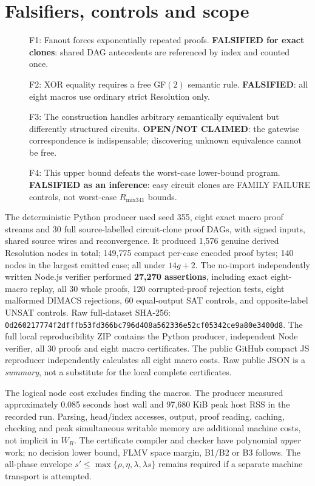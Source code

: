 \documentclass[11pt]{article}
\begin{document}
\section*{Falsifiers, controls and scope}
\begin{description}
\item[] F1: Fanout forces exponentially repeated proofs. \textbf{FALSIFIED for exact clones}: shared DAG antecedents are referenced by index and counted once.
\item[] F2: XOR equality requires a free GF$(2)$ semantic rule. \textbf{FALSIFIED}: all eight macros use ordinary strict Resolution only.
\item[] F3: The construction handles arbitrary semantically equivalent but differently structured circuits. \textbf{OPEN/NOT CLAIMED}: the gatewise correspondence is indispensable; discovering unknown equivalence cannot be free.
\item[] F4: This upper bound defeats the worst-case lower-bound program. \textbf{FALSIFIED as an inference}: easy circuit clones are FAMILY FAILURE controls, not worst-case $R_{\mathrm{mix341}}$ bounds.
\end{description}
The deterministic Python producer used seed 355, eight exact macro proof streams and 30 full source-labelled circuit-clone proof DAGs, with signed inputs, shared source wires and reconvergence. It produced 1,576 genuine derived Resolution nodes in total; 149,775 compact per-case encoded proof bytes; 140 nodes in the largest emitted case; all under $14g+2$. The no-import independently written Node.js verifier performed \textbf{27,270 assertions}, including exact eight-macro replay, all 30 whole proofs, 120 corrupted-proof rejection tests, eight malformed DIMACS rejections, 60 equal-output SAT controls, and opposite-label UNSAT controls. Raw full-dataset SHA-256: \texttt{0d260217774f2dfffb53fd366bc796d408a562336e52cf05342ce9a80e3400d8}. The full local reproducibility ZIP contains the Python producer, independent Node verifier, all 30 proofs and eight macro certificates. The public GitHub compact JS reproducer independently calculates all eight macro costs. Raw public JSON is a \emph{summary}, not a substitute for the local complete certificates.

The logical node cost excludes finding the macros. The producer measured approximately 0.085 seconds host wall and 97,680 KiB peak host RSS in the recorded run. Parsing, head/index accesses, output, proof reading, caching, checking and peak simultaneous writable memory are additional machine costs, not implicit in $W_R$. The certificate compiler and checker have polynomial \emph{upper} work; no decision lower bound, FLMV space margin, B1/B2 or B3 follows. The all-phase envelope $s'\le\max\{\rho,\eta,\lambda,\lambda s\}$ remains required if a separate machine transport is attempted.
\end{document}
